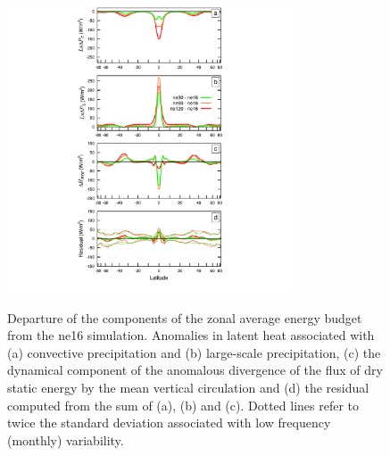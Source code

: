 \begin{figure}
\begin{center}
\noindent\includegraphics[width=20pc,angle=0]{chapter2/figure1.pdf}\\
\end{center}
\caption{Departure of the components of the zonal average energy budget from the ne16 simulation. Anomalies in latent heat associated with (a) convective precipitation and (b) large-scale precipitation, (c) the dynamical component of the anomalous divergence of the flux of dry static energy by the mean vertical circulation and (d) the residual computed from the sum of (a), (b) and (c). Dotted lines refer to twice the standard deviation associated with low frequency (monthly) variability.}
\label{fig:figure2-1}
\end{figure}

